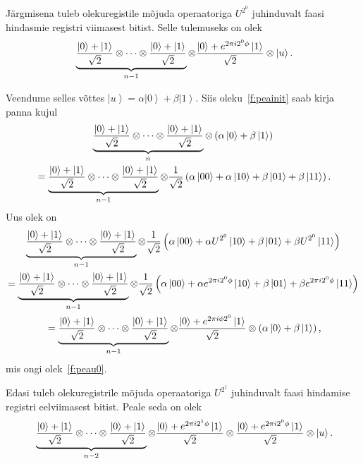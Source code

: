 \documentclass[12pt]{report}
\def\paren#1{\left(#1\right)}
\def\ket#1{\left|#1\right>}
\begin{document}
Järgmisena tuleb olekuregistile mõjuda operaatoriga \(U^{2^0}\) juhinduvalt faasi hindasmie registri viimasest bitist.
Selle tulemuseks on olek
\begin{align}\label{f:peau0}
    \underbrace{\frac{\ket{0}+\ket{1}}{\sqrt{2}}
    \otimes \cdots
    \otimes \frac{\ket{0}+\ket{1}}{\sqrt{2}}}_{n - 1}
    \otimes \frac{\ket{0}+e^{2\pi i2^0\phi}\ket{1}}{\sqrt{2}}
    \otimes \ket{u} \rlap{.}
\end{align}

Veendume selles võttes \(\ket{u} = \alpha\ket{0} + \beta\ket{1}\).
Siis oleku~\ref{f:peainit} saab kirja panna kujul
\begin{multline}
    \underbrace{\frac{\ket{0}+\ket{1}}{\sqrt{2}}
    \otimes \cdots
    \otimes \frac{\ket{0}+\ket{1}}{\sqrt{2}}}_n
    \otimes \paren{\alpha \ket{0} + \beta \ket{1}} \\
    = \underbrace{\frac{\ket{0}+\ket{1}}{\sqrt{2}}
    \otimes \cdots
    \otimes \frac{\ket{0}+\ket{1}}{\sqrt{2}}}_{n - 1}
    \otimes \frac{1}{\sqrt{2}} \paren{
        \alpha \ket{00} + \alpha \ket{10}
        + \beta \ket{01} + \beta \ket{11}
    } \rlap{.}
\end{multline}
Uus olek on
\begin{multline}
    \underbrace{\frac{\ket{0}+\ket{1}}{\sqrt{2}}
    \otimes \cdots
    \otimes \frac{\ket{0}+\ket{1}}{\sqrt{2}}}_{n - 1}
    \otimes \frac{1}{\sqrt{2}} \paren{
        \alpha \ket{00} + \alpha U^{2^0} \ket{10}
        + \beta \ket{01} + \beta U^{2^0} \ket{11}
    } \\
    = \underbrace{\frac{\ket{0}+\ket{1}}{\sqrt{2}}
    \otimes \cdots
    \otimes \frac{\ket{0}+\ket{1}}{\sqrt{2}}}_{n - 1}
    \otimes \frac{1}{\sqrt{2}} \paren{
        \alpha \ket{00} + \alpha e^{2\pi i2^0\phi} \ket{10}
        + \beta \ket{01} + \beta e^{2\pi i2^0\phi} \ket{11}
    } \\
    = \underbrace{\frac{\ket{0}+\ket{1}}{\sqrt{2}}
    \otimes \cdots
    \otimes \frac{\ket{0}+\ket{1}}{\sqrt{2}}}_{n - 1}
    \otimes \frac{\ket{0} + e^{2\pi i\phi 2^0} \ket{1}}{\sqrt{2}}
    \otimes \paren{\alpha \ket{0} + \beta \ket{1}} \rlap{,}
\end{multline}
mis ongi olek~\ref{f:peau0}.

Edasi tuleb olekuregistrile mõjuda operaatoriga \(U^{2^1}\) juhinduvalt faasi hindamise registri eelviimasest bitist.
Peale seda on olek
\begin{align}
    \underbrace{\frac{\ket{0} + \ket{1}}{\sqrt{2}}
    \otimes \cdots
    \otimes \frac{\ket{0} + \ket{1}}{\sqrt{2}}
    }_{n-2}
    \otimes \frac{\ket{0} + e^{2\pi i2^1\phi} \ket{1}}{\sqrt{2}}
    \otimes \frac{\ket{0} + e^{2\pi i2^0\phi} \ket{1}}{\sqrt{2}}
    \otimes \ket{u} \rlap{.}
\end{align}
\end{document}
